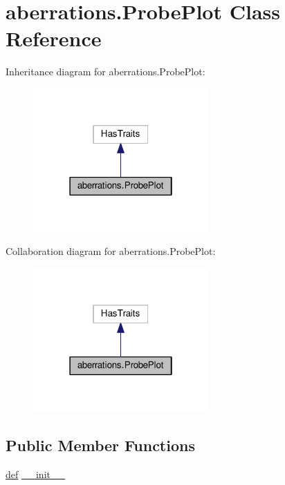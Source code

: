 \hypertarget{classaberrations_1_1_probe_plot}{\section{aberrations.\-Probe\-Plot Class Reference}
\label{classaberrations_1_1_probe_plot}
}


Inheritance diagram for aberrations.\-Probe\-Plot\-:
\nopagebreak
\begin{figure}[H]
\begin{center}
\leavevmode
\includegraphics[width=190pt]{classaberrations_1_1_probe_plot__inherit__graph}
\end{center}
\end{figure}


Collaboration diagram for aberrations.\-Probe\-Plot\-:
\nopagebreak
\begin{figure}[H]
\begin{center}
\leavevmode
\includegraphics[width=190pt]{classaberrations_1_1_probe_plot__coll__graph}
\end{center}
\end{figure}
\subsection*{Public Member Functions}
\begin{DoxyCompactItemize}
\item 
\hyperlink{sim_image_from_wave_8m_a72b6b8e83430abf007f20aeae4dc2f74}{def} \hyperlink{classaberrations_1_1_probe_plot_a375c718a4c08b81b86abcf8422b79243}{\-\_\-\-\_\-init\-\_\-\-\_\-}
\end{DoxyCompactItemize}
